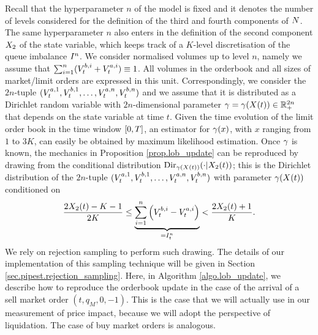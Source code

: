 \documentclass[10pt, article,table]{article}
\begin{document}
Recall that the hyperparameter $n$ of the model is fixed and it denotes the number of levels considered for the definition of the third and fourth components of $\multiCountingProc$.  The same hyperparameter $n$ also enters in the definition of the second component $\stateVariable_2$ of the state variable, which keeps track of a $K$-level discretisation of the queue imbalance $\volumeImbalance^n$. We consider normalised volumes up to level $n$, namely we assume that $\sum_{i=1}^{n} (\nthBestBidVolume[i]_t + \nthBestAskVolume[i]_t) \equiv 1$. All volumes in the orderbook and all sizes of market/limit orders are expressed in this unit.  Correspondingly, we consider the $2n$-tuple $(\nthBestAskVolume[1]_t,\nthBestBidVolume[1]_t, \dots, \nthBestAskVolume[n]_t,\nthBestBidVolume[n]_t)$ and we assume that it is distributed as a Dirichlet random variable with $2n$-dimensional parameter $\dirichletParam=\dirichletParam(\stateVariable(t)) \in \R_{+}^{2n}$ that depends on the state variable at time $t$. Given the time evolution of the limit order book in the time window $\timeWindow$, an estimator for $\dirparam(x)$, with $x$ ranging from $1$ to $3K$, can easily be obtained by maximum likelihood estimation. Once $\dirparam$ is known, the mechanics in Proposition \ref{prop.lob_update} can be reproduced by drawing from the conditional distribution $\text{Dir}_{\dirichletParam(\stateVariable(t))}(\cdot \vert \stateVariable_2 (t) )$; this is the Dirichlet distribution of  the $2n$-tuple $(\nthBestAskVolume[1]_t,\nthBestBidVolume[1]_t, \dots, \nthBestAskVolume[n]_t,\nthBestBidVolume[n]_t)$ with parameter $\dirparam(\stateVariable(t))$ conditioned on 
\begin{equation*}
 \frac{2\stateVariable_2(t) - K - 1}{2K}
 \leq 
 \underbrace{\sum_{i=1}^{n} \left( \nthBestBidVolume[i]_t - \nthBestAskVolume[i]_t \right)}_{= \volumeImbalance^n_t}
 <
 \frac{2\stateVariable_2(t) +1}{K}.
\end{equation*}
We rely on rejection sampling to perform such drawing. The details of our implementation of this sampling technique will be given in Section \ref{sec.pipest.rejection_sampling}. 
Here, in Algorithm \ref{algo.lob_update}, we describe how to reproduce the orderbook update in the case of the arrival of a sell market order $(t,q_M, 0, -1)$. This is the case that we will actually use in our measurement of price impact, because we will adopt the perspective of liquidation. The case of buy market orders is analogous. 
\end{document}
